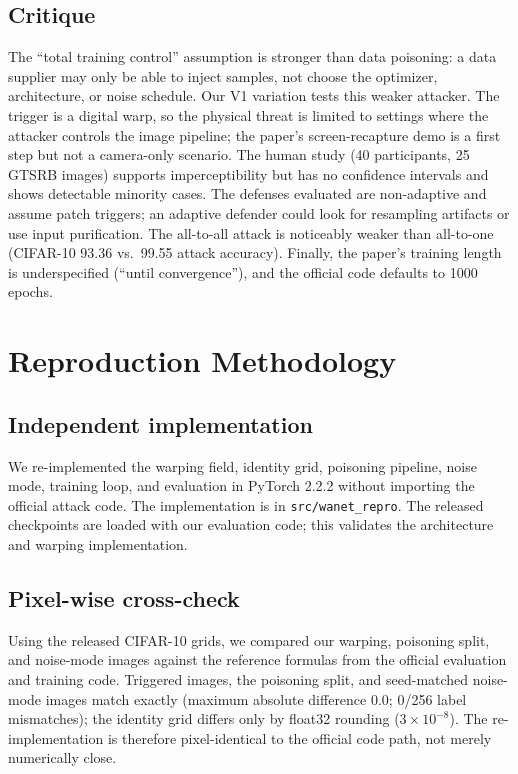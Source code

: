 \documentclass[conference]{IEEEtran}
\begin{document}
\subsection{Critique}
The ``total training control'' assumption is stronger than data poisoning: a
data supplier may only be able to inject samples, not choose the optimizer,
architecture, or noise schedule. Our V1 variation tests this weaker attacker.
The trigger is a digital warp, so the physical threat is limited to settings
where the attacker controls the image pipeline; the paper's screen-recapture
demo is a first step but not a camera-only scenario. The human study (40
participants, 25 GTSRB images) supports imperceptibility but has no confidence
intervals and shows detectable minority cases. The defenses evaluated are
non-adaptive and assume patch triggers; an adaptive defender could look for
resampling artifacts or use input purification. The all-to-all attack is
noticeably weaker than all-to-one (CIFAR-10 93.36 vs.\ 99.55 attack accuracy).
Finally, the paper's training length is underspecified (``until
convergence''), and the official code defaults to 1000 epochs.

\section{Reproduction Methodology}
\subsection{Independent implementation}
We re-implemented the warping field, identity grid, poisoning pipeline, noise
mode, training loop, and evaluation in PyTorch 2.2.2 without importing the
official attack code. The implementation is in \texttt{src/wanet\_repro}. The
released checkpoints are loaded with our evaluation code; this validates the
architecture and warping implementation.

\subsection{Pixel-wise cross-check}
Using the released CIFAR-10 grids, we compared our warping, poisoning split,
and noise-mode images against the reference formulas from the official
evaluation and training code. Triggered images, the poisoning split, and
seed-matched noise-mode images match exactly (maximum absolute difference
0.0; 0/256 label mismatches); the identity grid differs only by float32
rounding ($3\times10^{-8}$). The re-implementation is therefore pixel-identical
to the official code path, not merely numerically close.
\end{document}
